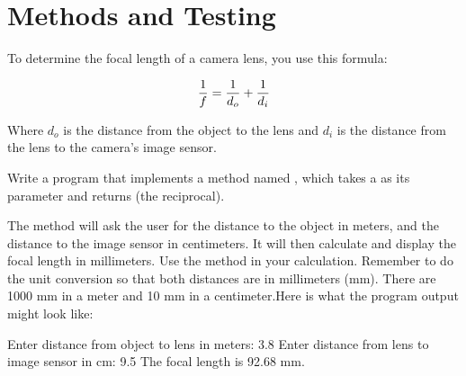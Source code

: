 \chapter{Methods and Testing}

\begin{exercise}
To determine the focal length of a camera lens, you use this formula:

\begin{equation*}
{1 \over f} = {1 \over d_o} + {1 \over d_i}
\end{equation*}

Where $d_o$ is the distance from the object to the lens and $d_i$ is the distance from the lens to the camera's image sensor.

Write a program that implements a method named , which takes a  as its parameter and returns  (the reciprocal).

The  method will ask the user for the distance to the object in meters, and the distance to the image sensor in centimeters. It will then calculate and display the focal length in millimeters. Use the  method in your calculation. Remember to do the unit conversion so that both distances are in millimeters (mm). There are 1000 mm in a meter and 10 mm in a centimeter.Here is what the program output might look like:

\begin{stdout}
Enter distance from object to lens in meters: 3.8
Enter distance from lens to image sensor in cm: 9.5
The focal length is 92.68 mm.
\end{stdout}

\end{exercise}

